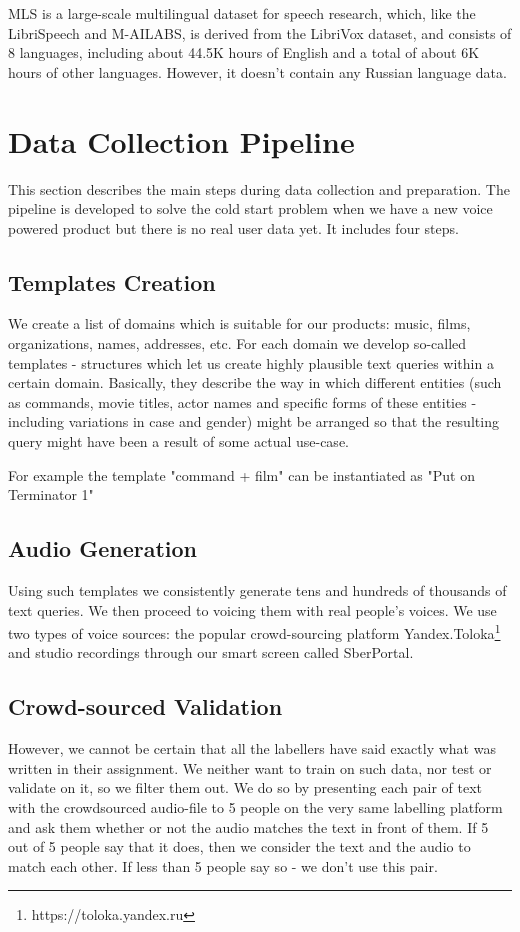 \documentclass[a4paper]{article}
\begin{document}
MLS \cite{pratap2020mls} is a large-scale multilingual dataset for speech research, which, like the LibriSpeech and M-AILABS, is derived from the LibriVox dataset, and consists of 8 languages, including about 44.5K hours of English and a total of about 6K hours of other languages. However, it doesn't contain any Russian language data.


\section{Data Collection Pipeline}

This section describes the main steps during data collection and preparation. The pipeline is developed to solve the cold start problem when we have a new voice powered product but there is no real user data yet. It includes four steps.

\subsection{Templates Creation}
We create a list of domains which is suitable for our products: music, films, organizations, names, addresses, etc.
For each domain we develop so-called templates - structures which let us create highly plausible text queries within a certain domain. Basically, they describe the way in which different entities (such as commands, movie titles, actor names and specific forms of these entities - including variations in case and gender) might be arranged so that the resulting query might have been a result of some actual use-case. 


For example the template "command + film" can be instantiated as "Put on Terminator 1"


\subsection{Audio Generation}
Using such templates we consistently generate tens and hundreds of thousands of text queries. We then proceed to voicing them with real people's voices. We use two types of voice sources: the popular crowd-sourcing platform Yandex.Toloka\footnote{https://toloka.yandex.ru} and studio recordings through our smart screen called SberPortal.

\subsection{Crowd-sourced Validation}
However, we cannot be certain that all the labellers have said exactly what was written in their assignment. We neither want to train on such data, nor test or validate on it, so we filter them out. We do so by presenting each pair of text with the crowdsourced audio-file to 5 people on the very same labelling platform and ask them whether or not the audio matches the text in front of them. If 5 out of 5 people say that it does, then we consider the text and the audio to match each other. If less than 5 people say so - we don't use this pair.
\end{document}

